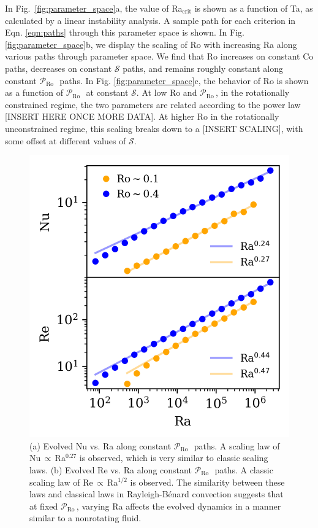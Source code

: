 \documentclass[twocolumn, amsmath, amsfonts, amssymb]{aastex62}
\newcommand{\RB}{Rayleigh-B\'{e}nard }
\newcommand{\pro}{\ensuremath{\mathcal{P}_{\text{Ro}}\,}}
\begin{document}
\label{sec:results}
In Fig.~\ref{fig:parameter_space}a, the value of Ra$_{\text{crit}}$
is shown as a function of Ta, as
calculated by a linear instability analysis. A sample path for
each criterion in Eqn. \ref{eqn:paths} through
this parameter space is shown.
In Fig. \ref{fig:parameter_space}b, we display the scaling of Ro
with increasing Ra along various paths through parameter space.
We find that Ro increases on constant Co paths, decreases on constant $\mathcal{S}$
paths, and remains roughly constant along constant \pro$\,$ paths.
In Fig. \ref{fig:parameter_space}c, the behavior of Ro is shown as
a function of \pro$\,$ at constant $\mathcal{S}$.
At low Ro and \pro, in the rotationally constrained regime, the two parameters
are related according to the power law [INSERT HERE ONCE MORE DATA].
At higher Ro in the rotationally unconstrained regime, this scaling breaks down
to a [INSERT SCALING], with some offset at different values of $\mathcal{S}$.
\begin{figure}[t!]
\includegraphics{./figs/nu_and_re.png}
\caption{(a) Evolved Nu vs. Ra along constant
\pro$\,$ paths. A scaling law of Nu$\,\propto\,$Ra$^{0.27}$ is observed, which
is very similar to classic scaling laws.
(b) Evolved Re vs. Ra along constant \pro$\,$ paths.
A classic scaling law of Re$\,\propto\,$Ra$^{1/2}$ is observed. The
similarity between these laws and
classical laws in \RB convection suggests that at fixed \pro, varying Ra
affects the evolved dynamics in a manner similar to a nonrotating fluid.
\label{fig:nu_and_re} }
\end{figure}
\end{document}
